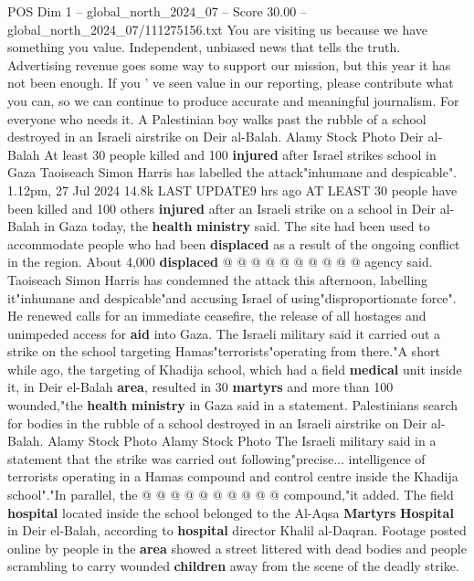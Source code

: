 \begin{textsample}{POS Dim 1 – global\_north\_2024\_07 – Score 30.00 – global\_north\_2024\_07/111275156.txt}  \label{ex:f1_pos_390}
You are visiting us because we have something you value.
Independent, unbiased news that tells the truth.
Advertising revenue goes some way to support our mission, but this year it has not been enough.
If you ' ve seen value in our reporting, please contribute what you can, so we can continue to produce accurate and meaningful journalism.
For everyone who needs it.
A Palestinian boy walks past the rubble of a school destroyed in an Israeli airstrike on Deir al-Balah.
Alamy Stock Photo Deir al-Balah At least 30 people killed and 100 \textbf{injured} after Israel strikes school in Gaza Taoiseach Simon Harris has labelled the attack"inhumane and despicable". 1.12pm, 27 Jul 2024 14.8k LAST UPDATE9 hrs ago AT LEAST 30 people have been killed and 100 others \textbf{injured} after an Israeli strike on a school in Deir al-Balah in Gaza today, the \textbf{health} \textbf{ministry} said.
The site had been used to accommodate people who had been \textbf{displaced} as a result of the ongoing conflict in the region.
About 4,000 \textbf{displaced} @ @ @ @ @ @ @ @ @ @ agency said.
Taoiseach Simon Harris has condemned the attack this afternoon, labelling it"inhumane and despicable"and accusing Israel of using"disproportionate force".
He renewed calls for an immediate ceasefire, the release of all hostages and unimpeded access for \textbf{aid} into Gaza.
The Israeli military said it carried out a strike on the school targeting Hamas"terrorists"operating from there."A short while ago, the targeting of Khadija school, which had a field \textbf{medical} unit inside it, in Deir el-Balah \textbf{area}, resulted in 30 \textbf{martyrs} and more than 100 wounded,"the \textbf{health} \textbf{ministry} in Gaza said in a statement.
Palestinians search for bodies in the rubble of a school destroyed in an Israeli airstrike on Deir al-Balah.
Alamy Stock Photo Alamy Stock Photo The Israeli military said in a statement that the strike was carried out following"precise... intelligence of terrorists operating in a Hamas compound and control centre inside the Khadija school"."In parallel, the @ @ @ @ @ @ @ @ @ @ compound,"it added.
The field \textbf{hospital} located inside the school belonged to the Al-Aqsa \textbf{Martyrs} \textbf{Hospital} in Deir el-Balah, according to \textbf{hospital} director Khalil al-Daqran.
Footage posted online by people in the \textbf{area} showed a street littered with dead bodies and people scrambling to carry wounded \textbf{children} away from the scene of the deadly strike.

\end{textsample}
